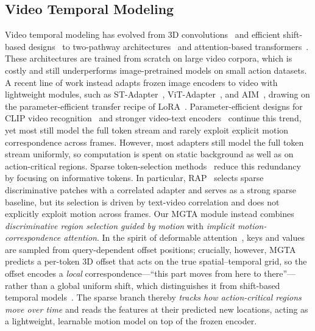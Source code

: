 \subsection{Video Temporal Modeling}
Video temporal modeling has evolved from 3D convolutions~\cite{tran2015c3d,tran2018i3d} and efficient shift-based designs~\cite{lin2019tsm} to two-pathway architectures~\cite{feichtenhofer2019slowfast} and attention-based transformers~\cite{bertasius2021timesformer,liu2022video_swin,fan2021multiscale,liu2024video_mamba}.
These architectures are trained from scratch on large video corpora, which is costly and still underperforms image-pretrained models on small action datasets.
A recent line of work instead adapts frozen image encoders to video with lightweight modules, such as ST-Adapter~\cite{pan2022st_adapter}, ViT-Adapter~\cite{chen2023vitadapter}, and AIM~\cite{yang2023aim}, drawing on the parameter-efficient transfer recipe of LoRA~\cite{hu2022lora}.
Parameter-efficient designs for CLIP video recognition~\cite{wang2024m2clip,wang2025vlpa} and stronger video-text encoders~\cite{wang2023internvideo,zhm2025siglip2} continue this trend, yet most still model the full token stream and rarely exploit explicit motion correspondence across frames.
However, most adapters still model the full token stream uniformly, so computation is spent on static background as well as on action-critical regions.
Sparse token-selection methods~\cite{li2024video,cao2024rap} reduce this redundancy by focusing on informative tokens.
In particular, RAP~\cite{cao2024rap} selects sparse discriminative patches with a correlated adapter and serves as a strong sparse baseline, but its selection is driven by text-video correlation and does not explicitly exploit motion across frames.
Our MGTA module instead combines \emph{discriminative region selection guided by motion} with \emph{implicit motion-correspondence attention}. In the spirit of deformable attention~\cite{dai2017deformable}, keys and values are sampled from query-dependent offset positions; crucially, however, MGTA predicts a per-token 3D offset that acts on the true spatial--temporal grid, so the offset encodes a \emph{local} correspondence---``this part moves from here to there''---rather than a global uniform shift, which distinguishes it from shift-based temporal models~\cite{lin2019tsm}. The sparse branch thereby \emph{tracks how action-critical regions move over time} and reads the features at their predicted new locations, acting as a lightweight, learnable motion model on top of the frozen encoder.
